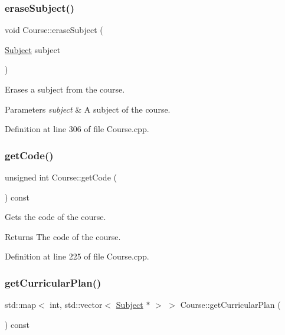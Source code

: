 \subsubsection{\texorpdfstring{erase\+Subject()}{eraseSubject()}}
{\footnotesize\ttfamily void Course\+::erase\+Subject (\begin{DoxyParamCaption}\item[{\hyperlink{classSubject}{Subject}}]{subject }\end{DoxyParamCaption})}

Erases a subject from the course. 
\begin{DoxyParams}{Parameters}
{\em subject} & A subject of the course. \\
\hline
\end{DoxyParams}


Definition at line 306 of file Course.\+cpp.

\mbox{\label{classCourse_a6203b3564734a69d94779f168ff60ab5}} 
\subsubsection{\texorpdfstring{get\+Code()}{getCode()}}
{\footnotesize\ttfamily unsigned int Course\+::get\+Code (\begin{DoxyParamCaption}{ }\end{DoxyParamCaption}) const}

Gets the code of the course. \begin{DoxyReturn}{Returns}
The code of the course. 
\end{DoxyReturn}


Definition at line 225 of file Course.\+cpp.

\mbox{\label{classCourse_a169989b538567685e25dcaf164b8e625}} 
\subsubsection{\texorpdfstring{get\+Curricular\+Plan()}{getCurricularPlan()}}
{\footnotesize\ttfamily std\+::map$<$ int, std\+::vector$<$ \hyperlink{classSubject}{Subject} $\ast$ $>$ $>$ Course\+::get\+Curricular\+Plan (\begin{DoxyParamCaption}{ }\end{DoxyParamCaption}) const}

